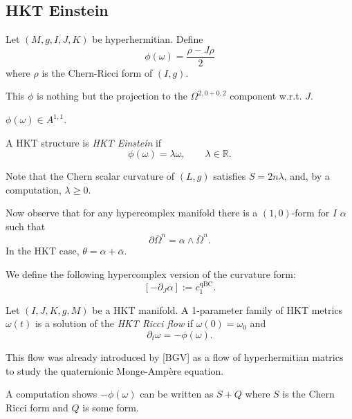 \subsection{HKT Einstein}
\label{subsection-hkt-einstein}

\begin{definition}
\label{definition-phi-hkt-einstein}
Let $(M,g,I,J,K)$ be hyperhermitian.
Define
$$
\phi(\omega)
=
\frac{\rho-J\rho}{2}
$$
where $\rho$ is the Chern-Ricci
form of $(I,g)$.
\end{definition}

\noindent
This $\phi$ is nothing but the
projection to the
$\Omega^{2,0+0,2}$ component w.r.t. $J$.

\begin{lemma}
\label{lemma-phi-is-a11}
$\phi(\omega) \in A^{1,1}$.
\end{lemma}

\begin{definition}
\label{definition-hkt-einstein}
A HKT structure is {\it HKT Einstein} 
if 
$$
\phi(\omega)=\lambda \omega,\qquad \lambda
\in \mathbb{R}.
$$
\end{definition}

\noindent
Note that the Chern scalar curvature
of $(L,g)$ satisfies $S=2n \lambda$,
and, by a computation,
$\lambda \geq 0$.

\medskip\noindent
Now observe that for any hypercomplex
manifold there is a $(1,0)$-form for $I$
$\alpha$ such that
$$
\partial \overline{\Omega}^n
=
\alpha \wedge \overline{\Omega}^n.
$$
In the HKT case,
$\theta=\alpha+\overline{\alpha}$.

We define the following hypercomplex version
of the curvature form:
$$
[-\partial_J\alpha]
:=c_1^{\operatorname{qBC}}.
$$

\begin{definition}
\label{definition-hkt-ricci-flow}
Let $(I,J,K,g,M)$ be a HKT manifold.
A 1-parameter family of HKT metrics
$\omega(t)$ is a solution of the
{\it HKT Ricci flow} if $\omega(0)=\omega_0$
and
$$
\partial_t \omega
=
-\phi(\omega).
$$
\end{definition}

\noindent
This flow was already introduced
by [BGV] as a flow of hyperhermitian
matrics to study the quaternionic
Monge-Ampère equation.

A computation shows
$-\phi(\omega)$
can be written as $S+Q$
where $S$ is the Chern Ricci form
and $Q$ is some form.






